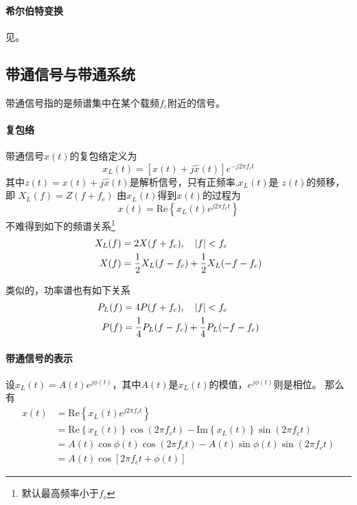     \paragraph{希尔伯特变换}\mbox{}

    见。

\subsection{带通信号与带通系统}\label{subsec:bandsystem}
    带通信号指的是频谱集中在某个载频$f_c$附近的信号。
    \paragraph{复包络}\mbox{}

    带通信号$x(t)$的复包络定义为
    \begin{equation}
        x_L(t)=[x(t)+j\hat{x}(t)]e^{-j2\pi f_ct}
    \end{equation}
    其中$z(t)=x(t)+j\hat{x}(t)$是解析信号，只有正频率,$x_L(t)$是 $z(t)$的频移，即
    $X_L(f)=Z(f+f_c)$
    由$x_L(t)$得到$x(t)$的过程为
    \begin{equation}
        x(t)=\text{Re}\left\{x_L(t)e^{j2\pi f_ct}\right\}
    \end{equation}
    不难得到如下的频谱关系\footnote{默认最高频率小于$f_c$}
    \begin{align}\label{eq:xl_x}
        X_L(f)&=2X(f+f_c),\hspace{1em}\left\vert f \right\vert<f_c\\
        X(f)&=\frac{1}{2}X_L(f-f_c)+\frac{1}{2}X_L(-f-f_c)
    \end{align}

    类似的，功率谱也有如下关系
    \begin{align}
        P_L(f)&=4P(f+f_c),\hspace{1em}\left\vert f \right\vert<f_c\\
        P(f)&=\frac{1}{4}P_L(f-f_c)+\frac{1}{4}P_L(-f-f_c)
    \end{align}

    \paragraph{带通信号的表示}\mbox{}

    设$x_L(t)=A(t)e^{j\phi (t)}$，其中$A(t)$是$x_L(t)$的模值，$e^{j\phi (t)}$则是相位。
    那么有
    \begin{equation}\label{eq:baoluo}
        \begin{split}
            x(t)&=\text{Re}\left\{x_L(t)e^{j2\pi f_ct}\right\}\\
                &=\text{Re}\left\{x_L(t)\right\}\cos (2\pi f_ct)-\text{Im}\left\{x_L(t)\right\}\sin (2\pi f_ct)\\
                &=A(t)\cos\phi(t)\cos (2\pi f_ct)-A(t)\sin\phi(t)\sin (2\pi f_ct)\\
                &=A(t)\cos[2\pi f_ct+\phi(t)]
        \end{split}
    \end{equation}

